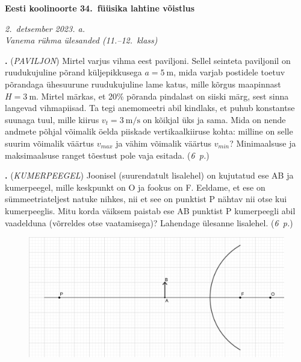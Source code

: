 \documentclass[11pt,a5paper]{article}
\newcommand{\numb}[1]{\vspace{5pt}\textbf{\large #1}}
\newcommand{\nimi}[1]{(\textsl{\small #1})}
\newcommand{\punktid}[1]{(\emph{#1~p.})}
\newcounter{ylesanne}
\newcommand{\yl}[1]{\addtocounter{ylesanne}{1}\numb{\theylesanne.} \nimi{#1} \newblock{}}
\newcommand{\autor}[1]{}%
\begin{document}
\begin{center}
  \textbf{\Large Eesti koolinoorte 34.\ füüsika lahtine võistlus} \par
  \emph{2.\ detsember 2023. a.\\Vanema rühma ülesanded (11.--12.\ klass)}
\end{center}

 \par



\yl{PAVILJON}
Mirtel varjus vihma eest paviljoni. Sellel seinteta paviljonil on ruudukujuline põrand küljepikkusega $a = \SI{5}{\meter}$, mida varjab postidele toetuv põrandaga ühesuurune ruudukujuline lame katus, mille kõrgus maapinnast $H=\SI{3}{\meter}$. Mirtel märkas, et 20\% põranda pindalast on siiski märg, sest sinna langevad vihmapiisad. Ta tegi anemomeetri abil kindlaks, et puhub konstantse suunaga tuul, mille kiirus $v_t = \SI{3}{\meter\per\second}$ on kõikjal üks ja sama. Mida on nende andmete põhjal võimalik öelda piiskade vertikaalkiiruse kohta: milline on selle suurim võimalik väärtus $v_{max}$ ja vähim võimalik väärtus $v_{min}$?
Minimaalsuse ja maksimaalsuse ranget tõestust pole vaja esitada.
\punktid{6} \autor{Uku Andreas Reigo}



\yl{KUMERPEEGEL}
Joonisel (suurendatult lisalehel) on kujutatud ese AB ja kumerpeegel, mille keskpunkt on O ja fookus on F. Eeldame, et ese on sümmeetriateljest natuke nihkes, nii et see on punktist P nähtav nii otse kui kumerpeeglis. Mitu korda väiksem paistab ese AB punktist P kumerpeegli abil vaadelduna (võrreldes otse vaatamisega)? Lahendage ülesanne lisalehel.
\punktid{6} \autor{Richard Luhtaru}

\begin{figure}[h]
    \centering

    \includegraphics[width=0.75\linewidth]{kumerpeegel_joonis.png}
     \vspace{-20pt}
\end{figure}
\end{document}
